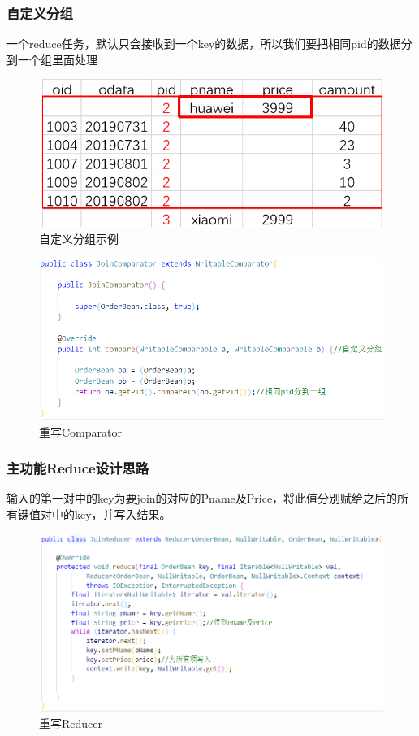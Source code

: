 \documentclass[a4paper,UTF8]{article}
\numberwithin{equation}{section}
\begin{document}
\subsubsection{自定义分组}
一个reduce任务，默认只会接收到一个key的数据，所以我们要把相同pid的数据分到一个组里面处理
\begin{figure}[H]
    \centering

    \includegraphics[width = 15cm]{comp1.png}

    \caption{自定义分组示例}
\end{figure}
\begin{figure}[H]
    \centering

    \includegraphics[width = 15cm]{comp2.png}

    \caption{重写Comparator}
\end{figure}
\subsubsection{主功能Reduce设计思路}
输入的第一对中的key为要join的对应的Pname及Price，将此值分别赋给之后的所有键值对中的key，并写入结果。
\begin{figure}[H]
    \centering

    \includegraphics[width = 15cm]{reducer.png}

    \caption{重写Reducer}
    \label{reducer}
\end{figure}
\end{document}

